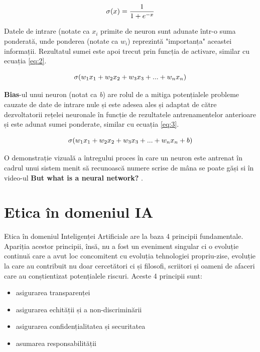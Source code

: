 \documentclass{article}
\begin{document}
\begin{equation}
    \centering
    \sigma(x) = \frac{1}{1 + e^{-x}}
    \label{eq:1}
\end{equation}

Datele de intrare (notate ca $x_i$ primite de neuron sunt adunate într-o suma ponderată, unde ponderea (notate ca $w_i$) reprezintă "importanța" aceastei informații. Rezultatul sumei este apoi trecut prin funcția de activare, similar cu ecuația \ref{eq:2}.

\begin{equation}
    \centering
    \sigma(w_1x_1 + w_2x_2 + w_3x_3+...+w_nx_n)
    \label{eq:2}
\end{equation}

\textbf{Bias}-ul unui neuron (notat ca \textit{b}) are rolul de a mitiga potențialele probleme cauzate de date de intrare nule și este adesea ales și adaptat de către dezvoltatorii rețelei neuronale în funcție de rezultatele antrenamentelor anterioare și este adunat sumei ponderate, similar cu ecuația \ref{eq:3}.

\begin{equation}
    \centering
    \sigma(w_1x_1 + w_2x_2 + w_3x_3+...+w_nx_n+b)
    \label{eq:3}
\end{equation}

O demonstrație vizuală a întregului proces în care un neuron este antrenat în cadrul unui sistem menit să recunoască numere scrise de mâna se poate găși si în video-ul \textbf{But what is a neural network?} \cite{3b1b}.

\newpage

\section{Etica în domeniul IA}
\quad Etica în domeniul Inteligenței Artificiale are la baza 4 principii fundamentale. Apariția acestor principii, însă, nu a fost un eveniment singular ci o evoluție continuă care a avut loc concomitent cu evoluția tehnologiei propriu-zise, evoluție la care au contribuit nu doar cercetători ci și filosofi, scriitori și oameni de afaceri care au conștientizat potențialele riscuri. Aceste 4 principii sunt:
\begin{itemize}
    \item asigurarea transparenței
    \item asigurarea echității și a non-discriminării
    \item asigurarea confidențialitatea și securitatea
    \item asumarea responsabilității
\end{itemize}
\end{document}
